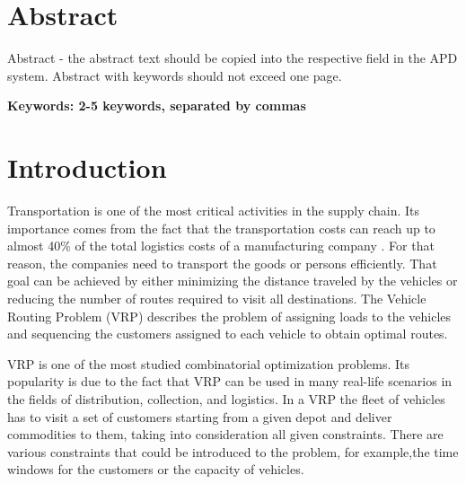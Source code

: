 \documentclass[a4paper,twoside,12pt]{book}
\newcounter{PagesWithoutNumbers}
\begin{document}
\pagestyle{onlyPageNumbers}
\tableofcontents

\setcounter{PagesWithoutNumbers}{\value{page}}
\mainmatter
\pagestyle{empty}

\chapter*{Abstract}

Abstract - the abstract text should be copied into the respective field in the APD system. Abstract with keywords should not exceed one page.

\bf{Keywords:} 2-5 keywords, separated by commas


\cleardoublepage


\pagestyle{PageNumbersChapterTitles}



\chapter{Introduction}

 Transportation is one of the most critical activities in the supply chain. Its importance comes from the fact that the transportation costs can reach up to almost 40\% of the total logistics costs of a manufacturing company \cite{bib:article:sukiennik}. For that reason, the companies need to transport the goods or persons efficiently. That goal can be achieved by either minimizing the distance traveled by the vehicles or reducing the number of routes required to visit all destinations. The Vehicle Routing Problem (VRP) describes the problem of assigning loads to the vehicles and sequencing the customers assigned to each vehicle to obtain optimal routes.

VRP is one of the most studied combinatorial optimization problems. Its popularity is due to the fact that VRP can be used in many real-life scenarios in the fields of distribution, collection, and logistics.
In a VRP the fleet of vehicles has to visit a set of customers starting from a given depot and deliver commodities to them, taking into consideration all given constraints. There are various constraints that could be introduced to the problem, for example,the time windows for the customers or the capacity of vehicles.
\end{document}
